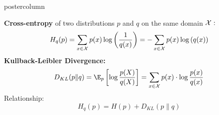 \documentclass{beamer}
\begin{document}
\begin{frame}[fragile]{}
\begin{columns}
\begin{column}{.31\textwidth}
\begin{beamercolorbox}[center]{postercolumn}
\begin{minipage}{.98\textwidth}
{\begin{myblock}{}
\begin{itemize}
								\end{itemize}
								\textbf{Cross-entropy} of two distributions $p$ and $q$ on the same domain $\mathcal{X}:$
								$$ 
									H_q(p) = \sum_{x \in \mathcal{X}} p(x) \log\left(\frac{1}{q(x)}\right) = - \sum_{x \in \mathcal{X}} p(x) \log\left(q(x)\right) 
								$$
								\textbf{Kullback-Leibler Divergence:}
								$$ 
									D_{KL}(p \| q) = \E_p \left[\log \frac{p(X)}{q(X)}\right] = \sum_{x \in \Xspace} p(x) \cdot \log \frac{p(x)}{q(x)} 
								$$
								Relationship:
								$$
									H_q(p) = H(p) + D_{KL}(p \| q)
								$$
							\end{myblock}



			  			}
					\end{minipage}
				\end{beamercolorbox}
			\end{column}
		\end{columns}

	\end{frame}
\end{document}
